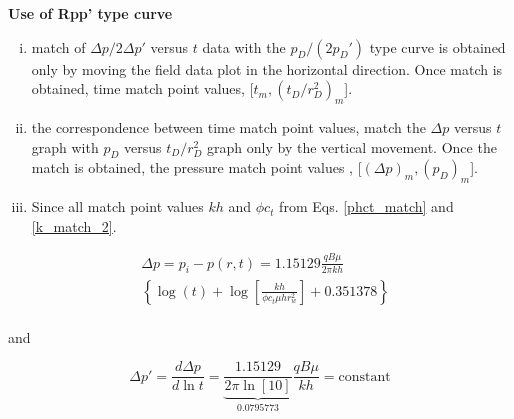 \documentclass{llncs}
\numberwithin{equation}{section}
\numberwithin{figure}{section}
\numberwithin{table}{section}
\begin{document}
    \textbf{Use of Rpp' type curve}

    \begin{enumerate}[(i)]
        \item   {} match of ${\Delta p}/{2\Delta p'}$ versus $t$ data with the ${{{p}_{D}}}/{\left( 2{{p}_{D}}' \right)}$ type curve is obtained only by moving the field data plot in the horizontal direction. Once match is obtained, time match point values, [$t_{m}, (t_{D}/r_{D}^{2})_{m}$].
        \item   {} the correspondence between time match point values, match the $\Delta p$ versus $t$ graph with $p_{D}$ versus ${{{t}_{D}}}/{r_{D}^{2}}$ graph only by the vertical movement. Once the match is obtained, the pressure match point values , [$(\Delta p)_{m}, (p_{D})_{m}$].
        \item   Since all match point values $kh$ and $\phi c_{t}$ from Eqs. \ref{phct_match} and \ref{k_match_2}.
    \end{enumerate}


    \begin{equation*}
    \begin{split}
    & \Delta p={{p}_{i}}-p\left( r,t \right)=\text{1}\text{.15129}\frac{qB\mu }{2\pi kh} \\
    & \left\{ \log \left( t \right)+\log \left[ \frac{kh}{\phi {{c}_{t}}\mu hr_{w}^{2}} \right]+\text{0}\text{.351378} \right\} \\
    \end{split}
    \end{equation*}

    and

    \begin{equation}
    \Delta p'=\frac{d\Delta p}{d\ln t}=\underbrace{\frac{\text{1}\text{.15129}}{2\pi \ln \left[ 10 \right]}}_{\text{0}\text{.0795773}}\frac{qB\mu }{kh}=\text{constant}
        \label{ddeltap_dlnt}
    \end{equation}
\end{document}
